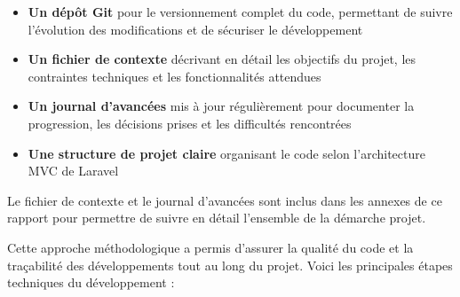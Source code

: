\documentclass[a4paper,12pt]{report}
\begin{document}
  \begin{itemize}
    \item \textbf{Un dépôt Git} pour le versionnement complet du code, permettant de suivre l'évolution des modifications et de sécuriser le développement
    
    \item \textbf{Un fichier de contexte} décrivant en détail les objectifs du projet, les contraintes techniques et les fonctionnalités attendues
    
    \item \textbf{Un journal d'avancées} mis à jour régulièrement pour documenter la progression, les décisions prises et les difficultés rencontrées
    
    \item \textbf{Une structure de projet claire} organisant le code selon l'architecture MVC de Laravel
  \end{itemize}
  
  \begin{tcolorbox}[colback=lightgray!50,colframe=naturacorpgreen!75,title=\textbf{Note},fonttitle=\bfseries,coltitle=white,boxrule=0.5mm,arc=3mm]
    Le fichier de contexte et le journal d'avancées sont inclus dans les annexes de ce rapport pour permettre de suivre en détail l'ensemble de la démarche projet.
  \end{tcolorbox}
  
  Cette approche méthodologique a permis d'assurer la qualité du code et la traçabilité des développements tout au long du projet. Voici les principales étapes techniques du développement :
  
\end{document}
